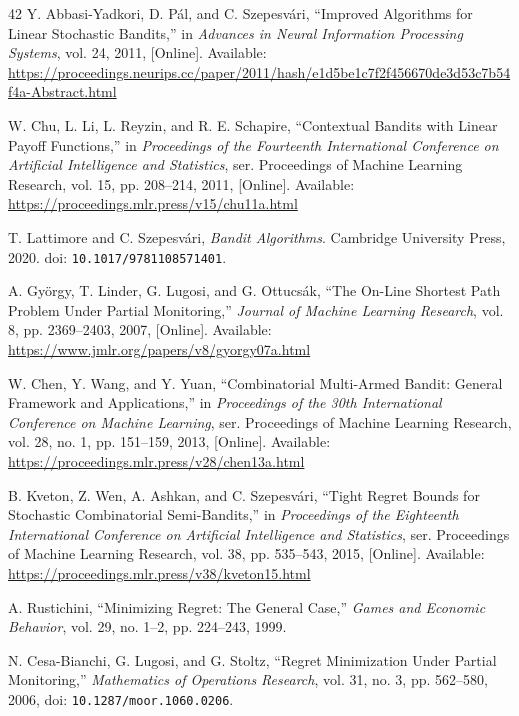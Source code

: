 \begin{thebibliography}{42}
Y. Abbasi-Yadkori, D. P\'{a}l, and C. Szepesv\'{a}ri, ``Improved Algorithms for Linear Stochastic Bandits,'' in \emph{Advances in Neural Information Processing Systems}, vol. 24, 2011, [Online]. Available: \url{https://proceedings.neurips.cc/paper/2011/hash/e1d5be1c7f2f456670de3d53c7b54f4a-Abstract.html}

W. Chu, L. Li, L. Reyzin, and R. E. Schapire, ``Contextual Bandits with Linear Payoff Functions,'' in \emph{Proceedings of the Fourteenth International Conference on Artificial Intelligence and Statistics}, ser. Proceedings of Machine Learning Research, vol. 15, pp. 208--214, 2011, [Online]. Available: \url{https://proceedings.mlr.press/v15/chu11a.html}

T. Lattimore and C. Szepesv\'{a}ri, \emph{Bandit Algorithms}. Cambridge University Press, 2020. doi: \nolinkurl{10.1017/9781108571401}.

A. Gy\"{o}rgy, T. Linder, G. Lugosi, and G. Ottucs\'{a}k, ``The On-Line Shortest Path Problem Under Partial Monitoring,'' \emph{Journal of Machine Learning Research}, vol. 8, pp. 2369--2403, 2007, [Online]. Available: \url{https://www.jmlr.org/papers/v8/gyorgy07a.html}

W. Chen, Y. Wang, and Y. Yuan, ``Combinatorial Multi-Armed Bandit: General Framework and Applications,'' in \emph{Proceedings of the 30th International Conference on Machine Learning}, ser. Proceedings of Machine Learning Research, vol. 28, no. 1, pp. 151--159, 2013, [Online]. Available: \url{https://proceedings.mlr.press/v28/chen13a.html}

B. Kveton, Z. Wen, A. Ashkan, and C. Szepesv\'{a}ri, ``Tight Regret Bounds for Stochastic Combinatorial Semi-Bandits,'' in \emph{Proceedings of the Eighteenth International Conference on Artificial Intelligence and Statistics}, ser. Proceedings of Machine Learning Research, vol. 38, pp. 535--543, 2015, [Online]. Available: \url{https://proceedings.mlr.press/v38/kveton15.html}

A. Rustichini, ``Minimizing Regret: The General Case,'' \emph{Games and Economic Behavior}, vol. 29, no. 1--2, pp. 224--243, 1999.

N. Cesa-Bianchi, G. Lugosi, and G. Stoltz, ``Regret Minimization Under Partial Monitoring,'' \emph{Mathematics of Operations Research}, vol. 31, no. 3, pp. 562--580, 2006, doi: \nolinkurl{10.1287/moor.1060.0206}.


\end{thebibliography}
